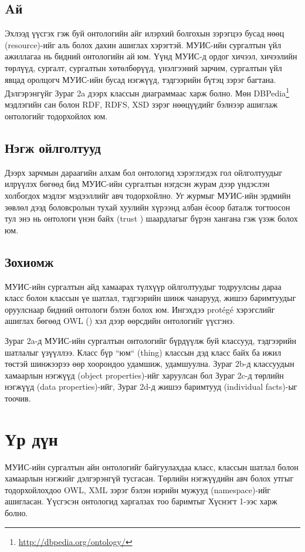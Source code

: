 \documentclass[conference, a4paper, mongolian]{myIEEEtran}
\begin{document}
\subsection{Aй}
%
Эхлээд үүсгэх гэж буй онтологийн айг илэрхий болгохын зэрэгцээ бусад нөөц (resource)-ийг аль болох дахин ашиглах хэрэгтэй. МУИС-ийн сургалтын үйл ажиллагаа нь бидний онтологийн ай юм. Үүнд МУИС-д ордог хичээл, хичээлийн төрлүүд, сургалт, сургалтын хөтөлбөрүүд, үнэлгээний зарчим, сургалтын үйл явцад оролцогч МУИС-ийн бусад нэгжүүд, тэдгээрийн бүтэц зэрэг багтана. Дэлгэрэнгүйг Зураг 2a дээрх классын диаграммаас харж болно. 
Мөн DBPedia\footnote{\url{http://dbpedia.org/ontology/}} мэдлэгийн сан болон RDF, RDFS, XSD зэрэг нөөцүүдийг бэлнээр ашиглаж онтологийг тодорхойлох юм.
%
\subsection{Нэгж ойлголтууд}
%
Дээрх зарчмын дараагийн алхам бол онтологид хэрэглэгдэх гол ойлголтуудыг илрүүлэх бөгөөд бид МУИС-ийн сургалтын нэгдсэн журам \cite{bib:8} дээр үндэслэн холбогдох мэдлэг мэдээллийг авч тодорхойлно. Уг журмыг МУИС-ийн эрдмийн зөвлөл дээд боловсролын тухай хуулийн хүрээнд албан ёсоор баталж тогтоосон тул энэ нь онтологи үнэн байх (trust \cite{bib:9}) шаардлагыг бүрэн хангана гэж үзэж болох юм.
%
\subsection{Зохиомж}
%
МУИС-ийн сургалтын айд хамаарах түлхүүр ойлголтуудыг тодруулсны дараа класс болон классын үе шатлал, 
тэдгээрийн шинж чанарууд, жишээ баримтуудыг оруулснаар бидний онтологи бэлэн болох юм. Ингэхдээ prot\'eg\'e хэрэгслийг ашиглах бөгөөд OWL (\cite{bib:10}) хэл дээр өөрсдийн онтологийг үүсгэнэ.

Зураг 2a-д МУИС-ийн сургалтын онтологийг бүрдүүлж буй классууд, тэдгээрийн шатлалыг үзүүллээ. Класс бүр ``юм`` (thing) классын дэд класс байх ба ижил төстэй шинжээрээ өөр хоорондоо удамшиж, удамшуулна. Зураг 2b-д классуудын хамаарлын нэгжүүд (object properties)-ийг харуулсан бол Зураг 2c-д төрлийн нэгжүүд (data properties)-ийг, Зураг 2d-д жишээ баримтууд (individual facts)-ыг тоочив.
%
\section{Үр дүн}
%
МУИС-ийн сургалтын айн онтологийг байгуулахдаа класс, классын шатлал болон хамаарлын нэгжийг дэлгэрэнгүй тусгасан. Төрлийн нэгжүүдийн авч болох утгыг тодорхойлохдоо OWL, XML зэрэг бэлэн нэрийн мужууд (namespace)-ийг ашигласан. Үүсгэсэн онтологид харгалзах тоо баримтыг Хүснэгт 1-ээс харж болно.
\end{document}
